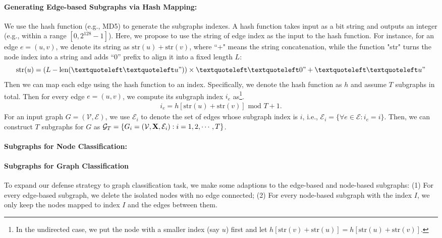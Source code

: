 \paragraph{Generating Edge-based Subgraphs via Hash Mapping:} We use the hash function (e.g., MD5) to generate the subgraphs indexes. A hash function takes input as a bit string and outputs an integer (e.g., within a range $[0,2^{128}-1]$). Here, we propose to use the string of edge index as the input to the hash function. For instance, for an edge $e=(u,v)$, we denote its string as $\textrm{str}(u)+\textrm{str}(v)$, where ``+" means the string concatenation, while the function "str" turns the node index into a string and adds “0” prefix to align it into a fixed length $L$:
\begin{equation}
    \textrm{str}(u) = (L-\textrm{len}(‘‘u"))\times‘‘0"+‘‘u"
\end{equation}
Then we can map each edge using the hash function to an index.
Specifically, we denote the hash function as $h$ and assume $T$ subgraphs %
in total. Then for every edge $e=(u,v)$, we compute its subgraph index $i_e$ as\footnote{In the undirected case, we put the node with a smaller index (say  $u$) first and let 
$h[\mathrm{str}(v) + \mathrm{str}(u)]=h[\mathrm{str}(u) + \mathrm{str}(v)]$.}. 
\begin{align}
\label{eqn:edgehash}
i_e = h[\mathrm{str}(u) + \mathrm{str}(v)] \, \, \mathrm{mod} \, \, T+1. 
\end{align}
For an input graph $G=(\mathcal{V},\mathcal{E})$, we use $\mathcal{E}_i$ to denote the set of edges whose subgraph index is $i$, i.e., $\mathcal{E}_i = \{\forall e \in \mathcal{E}: i_e= i \}.$ 
Then, we can construct $T$ subgraphs for $G$ as $\mathcal{G}_T = \{ {G}_i = (\mathcal{V},{\bf X}, \mathcal{E}_i): i=1,2,\cdots, T\}$. 


\paragraph{Subgraphs for Node Classification:}


\paragraph{Subgraphs for Graph Classification}
To expand our defense strategy to graph classification task, we make some adaptions to the edge-based and node-based subgraphs: (1) For every edge-based subgraph, we delete the isolated nodes with no edge connected; (2) For every node-based subgraph with the index $I$, we only keep the nodes mapped to index $I$ and the edges between them.


